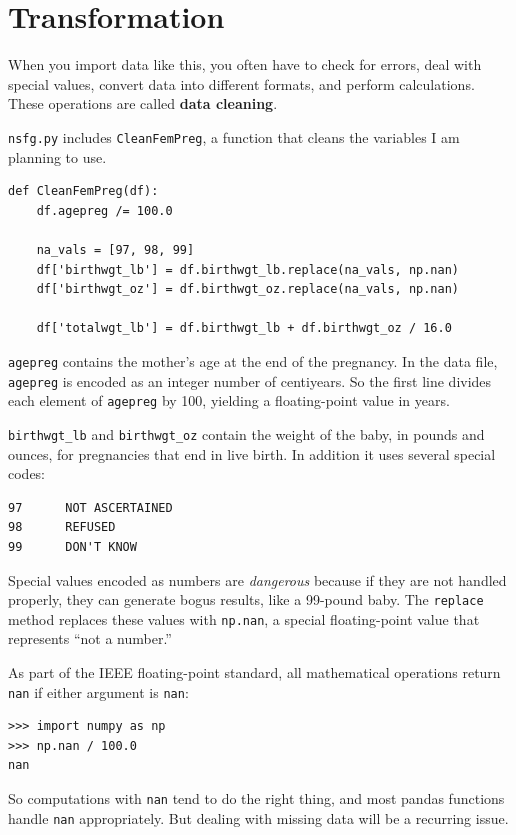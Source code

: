 \documentclass[12pt]{book}
\begin{document}
\section{Transformation}
\label{cleaning}

When you import data like this, you often have to check for errors,
deal with special values, convert data into different formats, and
perform calculations.  These operations are called {\bf data cleaning}.

\verb"nsfg.py" includes \verb"CleanFemPreg", a function that cleans
the variables I am planning to use.

\begin{verbatim}
def CleanFemPreg(df):
    df.agepreg /= 100.0

    na_vals = [97, 98, 99]
    df['birthwgt_lb'] = df.birthwgt_lb.replace(na_vals, np.nan)
    df['birthwgt_oz'] = df.birthwgt_oz.replace(na_vals, np.nan)

    df['totalwgt_lb'] = df.birthwgt_lb + df.birthwgt_oz / 16.0    
\end{verbatim}

\verb"agepreg" contains the mother's age at the end of the
pregnancy.  In the data file, \verb"agepreg" is encoded as an integer
number of centiyears.  So the first line divides each element
of \verb"agepreg" by 100, yielding a floating-point value in
years.

\verb"birthwgt_lb" and \verb"birthwgt_oz" contain the weight of the
baby, in pounds and ounces, for pregnancies that end in live birth.
In addition it uses several special codes:

\begin{verbatim}
97      NOT ASCERTAINED
98      REFUSED
99      DON'T KNOW
\end{verbatim}

Special values encoded as numbers are {\em dangerous\/} because if they
are not handled properly, they can generate bogus results, like
a 99-pound baby.  The \verb"replace" method replaces these values with
\verb"np.nan", a special floating-point value that represents ``not a
number.''

As part of the IEEE floating-point standard, all mathematical
operations return \verb"nan" if either argument is \verb"nan":

\begin{verbatim}
>>> import numpy as np
>>> np.nan / 100.0
nan
\end{verbatim}

So computations with \verb"nan" tend to do the right thing, and most
pandas functions handle \verb"nan" appropriately.  But dealing with
missing data will be a recurring issue.
\end{document}
